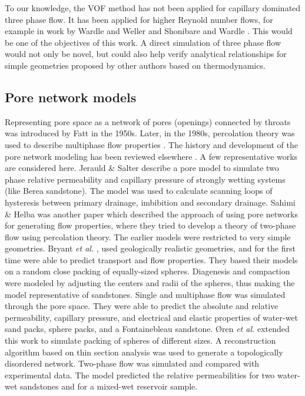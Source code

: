 To our knowledge, the VOF method has not been applied for capillary dominated three phase flow. It has been applied for higher Reynold number flows, for example in work by Wardle and Weller \cite{} and Shonibare and Wardle \cite{}. This would be one of the objectives of this work. A direct simulation of three phase flow would not only be novel, but could also help verify analytical relationships for simple geometries proposed by other authors based on thermodynamics.

\subsection{Pore network models}
Representing pore space as a network of pores (openings) connected by throats was introduced by Fatt\cite{fatt1956network} in the 1950s. Later, in the 1980s, percolation theory was used to describe multiphase flow properties \cite{blunt_detailed_2002}. The history and development of the pore network modeling has been reviewed elsewhere \cite{blunt_flow_2001}. A few representative works are considered here. Jerauld \& Salter \cite{jerauld_effect_1990} describe a pore model to simulate two phase relative permeability and capillary pressure of strongly wetting systems (like Berea sandstone). The model was used to calculate scanning loops of hysteresis between primary drainage, imbibition and secondary drainage. Sahimi \& Helba \cite{helba_percolation_1992} was another paper which described the approach of using pore networks for generating flow properties, where they tried to develop a theory of two-phase flow using percolation theory. The earlier models were restricted to very simple geometries. Bryant \emph{et al.} \cite{bryant_prediction_1992}, used geologically realistic geometries, and for the first time were able to predict transport and flow properties. They based their models on a random close packing of equally-sized spheres. Diagenesis and compaction were modeled by adjusting the centers and radii of the spheres, thus making the model representative of sandstones. Single and multiphase flow was simulated through the pore space. They were able to predict the absolute and relative permeability, capillary pressure, and electrical and elastic properties of water-wet sand packs, sphere packs, and a Fontainebleau sandstone. {\O}ren \emph{et al.} \cite{oren_extending_1998} extended this work to simulate packing of spheres of different sizes. A reconstruction algorithm based on thin section analysis was used to generate a topologically disordered network. Two-phase flow was simulated and compared with experimental data. The model predicted the relative permeabilities for two water-wet sandstones and for a mixed-wet reservoir sample.

